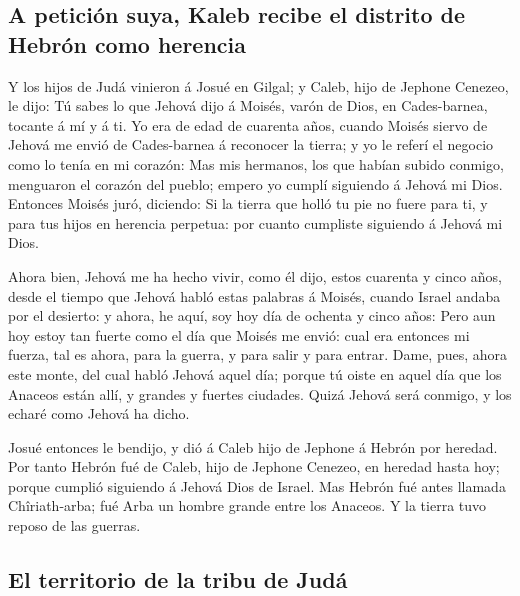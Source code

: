 \hypertarget{a-peticiuxf3n-suya-kaleb-recibe-el-distrito-de-hebruxf3n-como-herencia}{%
\subsection{A petición suya, Kaleb recibe el distrito de Hebrón como
herencia}\label{a-peticiuxf3n-suya-kaleb-recibe-el-distrito-de-hebruxf3n-como-herencia}}

 Y los hijos de Judá vinieron á Josué en Gilgal; y Caleb,
hijo de Jephone Cenezeo, le dijo: Tú sabes lo que Jehová dijo á Moisés,
varón de Dios, en Cades-barnea, tocante á mí y á ti.  Yo era
de edad de cuarenta años, cuando Moisés siervo de Jehová me envió de
Cades-barnea á reconocer la tierra; y yo le referí el negocio como lo
tenía en mi corazón:  Mas mis hermanos, los que habían
subido conmigo, menguaron el corazón del pueblo; empero yo cumplí
siguiendo á Jehová mi Dios.  Entonces Moisés juró, diciendo:
Si la tierra que holló tu pie no fuere para ti, y para tus hijos en
herencia perpetua: por cuanto cumpliste siguiendo á Jehová mi Dios.

 Ahora bien, Jehová me ha hecho vivir, como él dijo, estos
cuarenta y cinco años, desde el tiempo que Jehová habló estas palabras á
Moisés, cuando Israel andaba por el desierto: y ahora, he aquí, soy hoy
día de ochenta y cinco años:  Pero aun hoy estoy tan fuerte
como el día que Moisés me envió: cual era entonces mi fuerza, tal es
ahora, para la guerra, y para salir y para entrar.  Dame,
pues, ahora este monte, del cual habló Jehová aquel día; porque tú oiste
en aquel día que los Anaceos están allí, y grandes y fuertes ciudades.
Quizá Jehová será conmigo, y los echaré como Jehová ha dicho.

 Josué entonces le bendijo, y dió á Caleb hijo de Jephone á
Hebrón por heredad.  Por tanto Hebrón fué de Caleb, hijo de
Jephone Cenezeo, en heredad hasta hoy; porque cumplió siguiendo á Jehová
Dios de Israel.  Mas Hebrón fué antes llamada
Chîriath-arba; fué Arba un hombre grande entre los Anaceos. Y la tierra
tuvo reposo de las guerras.

\hypertarget{el-territorio-de-la-tribu-de-juduxe1}{%
\subsection{El territorio de la tribu de
Judá}\label{el-territorio-de-la-tribu-de-juduxe1}}

